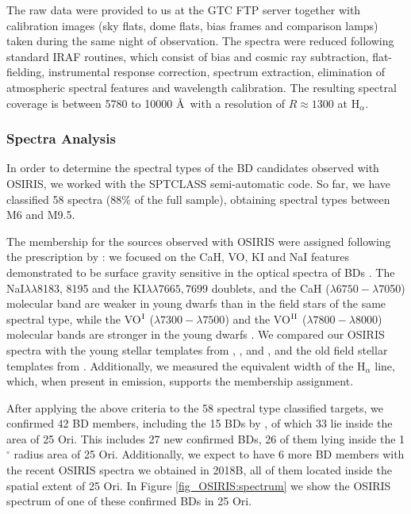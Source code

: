 \documentclass[12pt]{article}
\newcounter{subsubsubsection}[subsubsection]
\begin{document}
\label{sec_OSIRIS:reduction}
The raw data were provided to us at the GTC FTP server together with calibration images (sky flats, dome flats, bias frames and comparison lamps) taken during the same night of observation. The spectra were reduced following standard IRAF routines, which consist of bias and cosmic ray subtraction, flat-fielding, instrumental response correction, spectrum extraction, elimination of atmospheric spectral features and wavelength calibration. The resulting spectral coverage is between 5780 to 10000 \AA\ with a resolution of $R\approx1300$ at H$_\alpha$.

\subsubsection{Spectra Analysis}
\label{sec_OSIRIS:analysis}

\label{sec_OSIRIS:membership}
In order to determine the spectral types of the BD candidates observed with OSIRIS, we worked with the SPTCLASS semi-automatic code. So far, we have classified 58 spectra (88\%  of the full sample), obtaining spectral types between M6 and M9.5.

The membership for the sources observed with OSIRIS were assigned following the prescription by \citet{Downes2015}: we focused on the CaH, VO, KI and NaI features demonstrated to be surface gravity sensitive in the optical spectra of BDs \citep{Martin1996}. The NaI$\lambda\lambda$8183, 8195 and the KI$\lambda\lambda7665, 7699$ doublets, and the CaH ($\lambda6750-\lambda$7050) molecular band are weaker in young dwarfs than in the field stars of the same spectral type, while the VO$^{\textrm{\scriptsize{I}}}$ ($\lambda7300-\lambda7500$) and the VO$^{\textrm{\scriptsize{II}}}$ ($\lambda7800-\lambda8000$) molecular bands are stronger in the young dwarfs \citep{McGovern2004}. We compared our OSIRIS spectra with the young stellar templates from \citet{Luhman2000}, \citet{Briceno2002}, \citet{Luhman2003b} and \citet{Luhman2004}, and the old field stellar templates from \citet{Kirkpatrick1999}. Additionally, we measured the equivalent width of the H$_\alpha$ line, which, when present in emission, supports the membership assignment.

After applying the above criteria to the 58 spectral type classified targets, we confirmed 42 BD members, including the 15 BDs by \citet{Downes2015}, of which 33 lie inside the area of 25 Ori. This includes 27 new confirmed BDs, 26 of them lying inside the 1$^\circ$ radius area of 25 Ori. Additionally, we expect to have 6 more BD members with the recent OSIRIS spectra we obtained in 2018B, all of them located inside the spatial extent of 25 Ori. In Figure \ref{fig_OSIRIS:spectrum} we show the OSIRIS spectrum of one of these confirmed BDs in 25 Ori.
\end{document}
